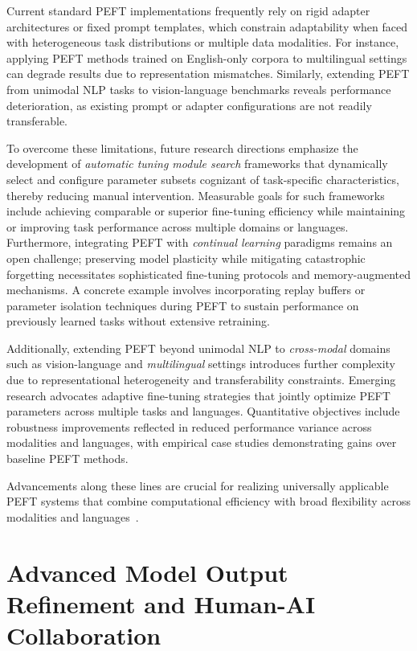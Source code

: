 \documentclass[sigconf]{acmart}
\begin{document}
Current standard PEFT implementations frequently rely on rigid adapter architectures or fixed prompt templates, which constrain adaptability when faced with heterogeneous task distributions or multiple data modalities. For instance, applying PEFT methods trained on English-only corpora to multilingual settings can degrade results due to representation mismatches. Similarly, extending PEFT from unimodal NLP tasks to vision-language benchmarks reveals performance deterioration, as existing prompt or adapter configurations are not readily transferable.

To overcome these limitations, future research directions emphasize the development of \textit{automatic tuning module search} frameworks that dynamically select and configure parameter subsets cognizant of task-specific characteristics, thereby reducing manual intervention. Measurable goals for such frameworks include achieving comparable or superior fine-tuning efficiency while maintaining or improving task performance across multiple domains or languages. Furthermore, integrating PEFT with \textit{continual learning} paradigms remains an open challenge; preserving model plasticity while mitigating catastrophic forgetting necessitates sophisticated fine-tuning protocols and memory-augmented mechanisms. A concrete example involves incorporating replay buffers or parameter isolation techniques during PEFT to sustain performance on previously learned tasks without extensive retraining.

Additionally, extending PEFT beyond unimodal NLP to \textit{cross-modal} domains such as vision-language and \textit{multilingual} settings introduces further complexity due to representational heterogeneity and transferability constraints. Emerging research advocates adaptive fine-tuning strategies that jointly optimize PEFT parameters across multiple tasks and languages. Quantitative objectives include robustness improvements reflected in reduced performance variance across modalities and languages, with empirical case studies demonstrating gains over baseline PEFT methods.

Advancements along these lines are crucial for realizing universally applicable PEFT systems that combine computational efficiency with broad flexibility across modalities and languages~\cite{ref48}.

\section{Advanced Model Output Refinement and Human-AI Collaboration}
\end{document}
